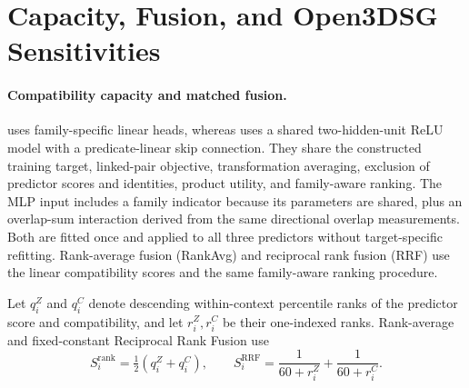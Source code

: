 \section{Capacity, Fusion, and Open3DSG Sensitivities}

\paragraph{Compatibility capacity and matched fusion.}
\methodlinear{} uses family-specific linear heads, whereas \methodmlp{} uses a
shared two-hidden-unit ReLU model with a predicate-linear skip connection. They
share the constructed training target, linked-pair objective, transformation
averaging, exclusion of predictor scores and identities, product utility, and
family-aware ranking. The MLP input includes a family indicator because its
parameters are shared, plus an overlap-sum interaction derived from the same
directional overlap measurements. Both are fitted once and applied to all three
predictors without target-specific refitting. Rank-average fusion (RankAvg) and
reciprocal rank fusion (RRF) use the linear compatibility scores and the same
family-aware ranking procedure.

Let $q_i^Z$ and $q_i^C$ denote descending within-context percentile ranks of
the predictor score and compatibility, and let $r_i^Z,r_i^C$ be their
one-indexed ranks. Rank-average and fixed-constant Reciprocal Rank Fusion use
\begin{equation}
S_i^{\mathrm{rank}}=\tfrac12(q_i^Z+q_i^C),\qquad
S_i^{\mathrm{RRF}}=\frac{1}{60+r_i^Z}+\frac{1}{60+r_i^C}.
\end{equation}


